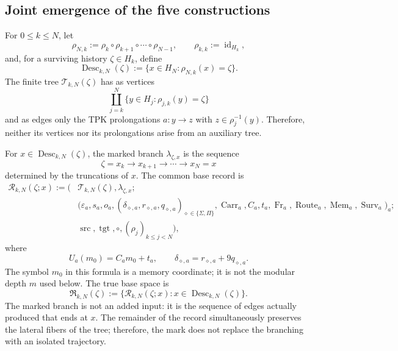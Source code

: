 \subsection{Joint emergence of the five constructions}
\label{act21:sec:cinco-construcciones-continuo-ch}

For \(0\leq k\leq N\), let
\[
 \rho_{N,k}:=\rho_k\circ\rho_{k+1}\circ\cdots\circ\rho_{N-1},
 \qquad \rho_{k,k}:=\operatorname{id}_{H_k},
\]
and, for a surviving history \(\zeta\in H_k\), define
\[
 \operatorname{Desc}_{k,N}(\zeta)
 :=\{x\in H_N:\rho_{N,k}(x)=\zeta\}.
\]
The finite tree \(\mathscr T_{k,N}(\zeta)\) has as vertices
\[
 \coprod_{j=k}^{N}\{y\in H_j:\rho_{j,k}(y)=\zeta\}
\]
and as edges only the TPK prolongations
\(a:y\to z\) with \(z\in\rho_j^{-1}(y)\). Therefore, neither its vertices nor
its prolongations arise from an auxiliary tree.

For \(x\in\operatorname{Desc}_{k,N}(\zeta)\), the marked branch
\(\lambda_{\zeta,x}\) is the sequence
\[
 \zeta=x_k\longrightarrow x_{k+1}\longrightarrow\cdots
 \longrightarrow x_N=x
\]
determined by the truncations of \(x\). The common base record is
\[
\begin{aligned}
 \mathscr R_{k,N}(\zeta;x):=
 \bigl(&\mathscr T_{k,N}(\zeta),\lambda_{\zeta,x};\\
 &\bigl(\varepsilon_a,s_a,o_a,
   (\delta_{\diamond,a},r_{\diamond,a},q_{\diamond,a})
       _{\diamond\in\{\Sigma,\Pi\}},
   \operatorname{Carr}_a,C_a,t_a,\operatorname{Fr}_a,
   \operatorname{Route}_a,\operatorname{Mem}_a,
   \operatorname{Surv}_a\bigr)_a;\\
 &\operatorname{src},\operatorname{tgt},\circ,
   (\rho_j)_{k\leq j<N}\bigr),
\end{aligned}
\tag{C1}
\label{act21:eq:base-comun-registros}
\]
where
\[
 U_a(m_0)=C_am_0+t_a,
 \qquad
 \delta_{\diamond,a}=r_{\diamond,a}+9q_{\diamond,a}.
\]
The symbol \(m_0\) in this formula is a memory coordinate; it is not the
modular depth \(m\) used below. The true base space is
\[
 \mathfrak R_{k,N}(\zeta)
 :=\{\mathscr R_{k,N}(\zeta;x):
       x\in\operatorname{Desc}_{k,N}(\zeta)\}.
\]
The marked branch is not an added input: it is the sequence of edges
actually produced that ends at \(x\). The remainder of the record simultaneously
preserves the lateral fibers of the tree; therefore, the mark does not replace
the branching with an isolated trajectory.

